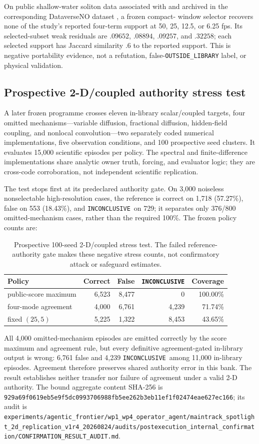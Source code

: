 \documentclass{article}
\newcommand{\OUT}{\texttt{OUTSIDE\_LIBRARY}\xspace}
\newcommand{\INC}{\texttt{INCONCLUSIVE}\xspace}
\begin{document}
On public shallow-water soliton data associated with \citet{heinrich2025shallow} and archived in
the corresponding DataverseNO dataset \citep{heinrich2026dataset}, a frozen compact-
window selector recovers none of the study's reported four-term support at 50, 25, 12.5, or
6.25 fps. Its selected-subset weak residuals are $.09652$, $.08894$, $.09257$, and $.32258$;
each selected support has Jaccard similarity $.6$ to the reported support. This is negative
portability evidence, not a refutation, false-\OUT label, or physical validation.

\subsection{Prospective 2-D/coupled authority stress test}
A later frozen programme crosses eleven in-library scalar/coupled targets, four omitted
mechanisms---variable diffusion, fractional diffusion, hidden-field coupling, and nonlocal
convolution---two separately coded numerical implementations, five observation conditions, and
100 prospective seed clusters. It evaluates 15,000 scientific episodes per policy. The spectral
and finite-difference implementations share analytic owner truth, forcing, and evaluator logic;
they are cross-code corroboration, not independent scientific replication.

The test stops first at its predeclared authority gate. On 3,000 noiseless nonselectable
high-resolution cases, the reference is correct on 1,718 (57.27\%), false on 553 (18.43\%), and
\INC\ on 729; it separates only 376/800 omitted-mechanism cases, rather than the required 100\%.
The frozen policy counts are:
\begin{table}[ht]
\centering\small
\caption{Prospective 100-seed 2-D/coupled stress test. The failed reference-authority gate makes
these negative stress counts, not confirmatory attack or safeguard estimates.}
\label{tab:2d-coupled-negative}
\begin{tabular}{lrrrr}
\toprule
Policy & Correct & False & \INC & Coverage \\
\midrule
public-score maximum & 6,523 & 8,477 & 0 & 100.00\% \\
four-mode agreement & 4,000 & 6,761 & 4,239 & 71.74\% \\
fixed $(25,5)$ & 5,225 & 1,322 & 8,453 & 43.65\% \\
\bottomrule
\end{tabular}
\end{table}
All 4,000 omitted-mechanism episodes are emitted correctly by the score maximum and agreement
rule, but every definitive agreement-gated in-library output is wrong: 6,761 false and 4,239
\INC\ among 11,000 in-library episodes. Agreement therefore preserves shared authority error in
this bank. The result establishes neither transfer nor failure of agreement under a valid 2-D
authority. The bound aggregate content SHA-256 is
\nolinkurl{929a69f0619eb5e9f5dc0993706988fb5ee262b3eb11ef1f02474eae627ec166}; its audit is
\nolinkurl{experiments/agentic_frontier/wp1_wp4_operator_agent/maintrack_spotlight_2d_replication_v1r4_20260824/audits/postexecution_internal_confirmation/CONFIRMATION_RESULT_AUDIT.md}.
\end{document}

